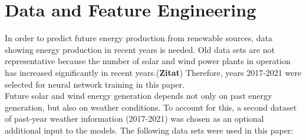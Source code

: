 \documentclass[11pt,table]{article}
\begin{document}




\section{Data and Feature Engineering}
In order to predict future energy production from renewable sources, data showing energy production in recent years is needed. Old data sets are not representative because the number of solar and wind power plants in operation has increased significantly in recent years.(\textbf{Zitat}) Therefore, years 2017-2021 were selected for neural network training in this paper. \\
Future solar and wind energy generation depends not only on past energy generation, but also on weather conditions. To account for this, a second dataset of past-year weather information (2017-2021) was chosen as an optional additional input to the models.
The following data sets were used in this paper:
\end{document}
